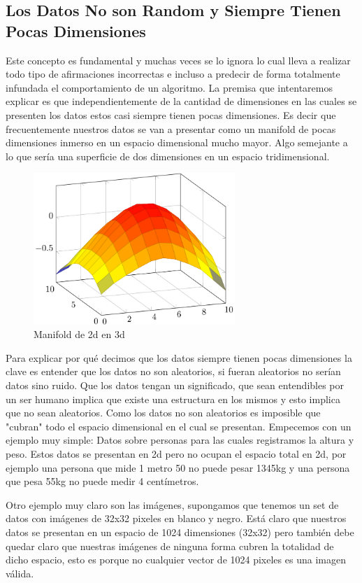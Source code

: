 \subsection{Los Datos No son Random y Siempre Tienen Pocas Dimensiones}

Este concepto es fundamental y muchas veces se lo ignora lo cual lleva a realizar todo tipo de afirmaciones incorrectas e incluso a predecir de forma totalmente infundada el comportamiento de un algoritmo. La premisa que intentaremos explicar es que independientemente de la cantidad de dimensiones en las cuales se presenten los datos estos casi siempre tienen pocas dimensiones. Es decir que frecuentemente nuestros datos se van a presentar como un manifold de pocas dimensiones inmerso en un espacio dimensional mucho mayor. Algo semejante a lo que sería una superficie de dos dimensiones en un espacio tridimensional.

\begin{figure}[!htb]
\centering
\includegraphics[width=3in]{figures/2dmanifold-fig.png}
\caption{Manifold de 2d en 3d}

\end{figure}

Para explicar por qué decimos que los datos siempre tienen pocas dimensiones la clave es entender que los datos no son aleatorios, si fueran aleatorios no serían datos sino ruido. Que los datos tengan un significado, que sean entendibles por un ser humano implica que existe una estructura en los mismos y esto implica que no sean aleatorios. Como los datos no son aleatorios es imposible que "cubran" todo el espacio dimensional en el cual se presentan. Empecemos con un ejemplo muy simple: Datos sobre personas para las cuales registramos la altura y peso. Estos datos se presentan en 2d pero no ocupan el espacio total en 2d, por ejemplo una persona que mide 1 metro 50 no puede pesar 1345kg y una persona que pesa 55kg no puede medir 4 centímetros. 

Otro ejemplo muy claro son las imágenes, supongamos que tenemos un set de datos con imágenes de 32x32 pixeles en blanco y negro. Está claro que nuestros datos se presentan en un espacio de 1024 dimensiones (32x32) pero también debe quedar claro que nuestras imágenes de ninguna forma cubren la totalidad de dicho espacio, esto es porque no cualquier vector de 1024 pixeles es una imagen válida.

